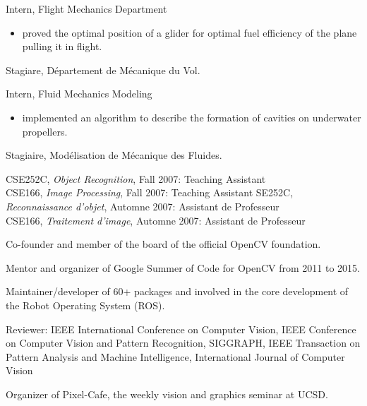\documentclass{article}
\begin{document}
\begin{llist}
 
{
Intern, Flight Mechanics Department
\vspace{-0.33cm}
\begin{itemize}
 \item proved the optimal position of a glider for optimal fuel efficiency of the plane pulling it in flight.
\end{itemize}
}
{
Stagiare, D\'{e}partement de M\'{e}canique du Vol.
}

 
{
Intern, Fluid Mechanics Modeling
\vspace{-0.33cm}
\begin{itemize}
 \item implemented an algorithm to describe the formation of cavities on underwater propellers.
\end{itemize}
}
{
Stagiaire, Mod\'{e}lisation de M\'{e}canique des Fluides.
}

{
}
{
}
{
CSE252C, {\em Object Recognition}, Fall 2007: Teaching Assistant\\
CSE166, {\em Image Processing}, Fall 2007: Teaching Assistant
}
{
SE252C, {\em Reconnaissance d'objet}, Automne 2007: Assistant de Professeur\\
CSE166, {\em Traitement d'image}, Automne 2007: Assistant de Professeur
}

{

Co-founder and member of the board of the official OpenCV foundation.

Mentor and organizer of Google Summer of Code for OpenCV from 2011 to 2015.

Maintainer/developer of 60+ packages and involved in the core development of the Robot Operating System (ROS).

Reviewer: IEEE International Conference on Computer Vision, IEEE Conference on Computer Vision and Pattern Recognition, 
SIGGRAPH, IEEE Transaction on Pattern Analysis and Machine Intelligence, International Journal of Computer Vision

Organizer of Pixel-Cafe, the weekly vision and graphics seminar at UCSD.

}
\end{llist}
\end{document}
